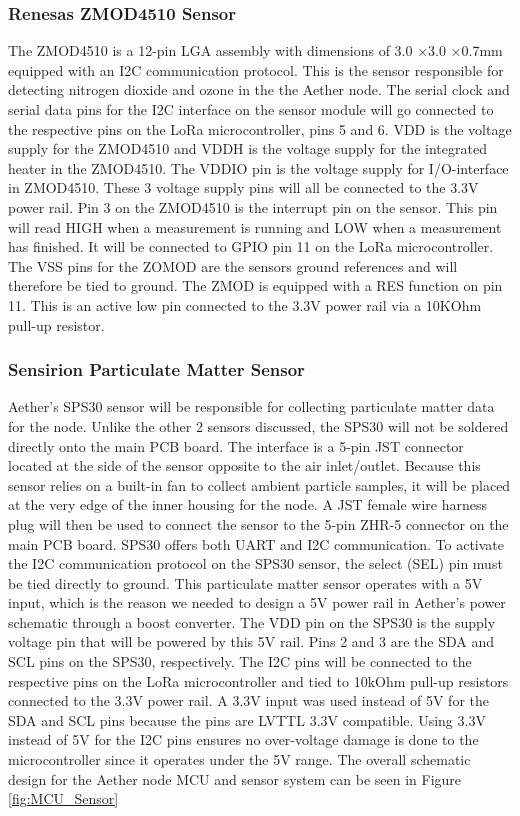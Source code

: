 \paragraph{}

\subsubsection{Renesas ZMOD4510 Sensor}
The ZMOD4510 is a 12-pin LGA assembly with dimensions of 3.0 ×3.0 ×0.7mm equipped with an I2C communication protocol. This is the sensor responsible for detecting nitrogen dioxide and ozone in the the Aether node. The serial clock and serial data pins for the I2C interface on the sensor module will go connected to the respective pins on the LoRa microcontroller, pins 5 and 6. VDD is the voltage supply for the ZMOD4510 and VDDH is the voltage supply for the integrated heater in the ZMOD4510. The VDDIO pin is the voltage supply for I/O-interface in ZMOD4510. These 3 voltage supply pins will all be connected to the 3.3V power rail. Pin 3 on the ZMOD4510 is the interrupt pin on the sensor. This pin will read HIGH when a measurement is running and LOW when a measurement has finished. It will be connected to GPIO pin 11 on the LoRa microcontroller. The VSS pins for the ZOMOD are the sensors ground references and will therefore be tied to ground. The ZMOD is equipped with a RES function on pin 11. This is an  active low pin connected to the 3.3V power rail via a 10KOhm pull-up resistor. 

\subsubsection{Sensirion Particulate Matter Sensor}
Aether's SPS30 sensor will be responsible for collecting particulate matter data for the node. Unlike the other 2 sensors discussed, the SPS30 will not be soldered directly onto the main PCB board. The interface is a 5-pin JST connector located at the side of the sensor opposite to the air inlet/outlet. Because this sensor relies on a built-in fan to collect ambient particle samples, it will be placed at the very edge of the inner housing for the node. A JST female wire harness plug will then be used to connect the sensor to the 5-pin ZHR-5 connector on the main PCB board. SPS30 offers both UART and I2C communication. To activate the I2C communication protocol on the SPS30 sensor, the select (SEL) pin must be tied directly to ground. This particulate matter sensor operates with a 5V input, which is the reason we needed to design a 5V power rail in Aether's power schematic through a boost converter. The VDD pin on the SPS30 is the supply voltage pin that will be powered by this 5V rail. Pins 2 and 3 are the SDA and SCL pins on the SPS30, respectively. The I2C pins will be connected to the respective pins on the LoRa microcontroller and tied to 10kOhm pull-up resistors connected to the 3.3V power rail. A 3.3V input was used instead of 5V for the SDA and SCL pins because the pins are LVTTL 3.3V compatible. Using 3.3V instead of 5V for the I2C pins ensures no over-voltage damage is done to the microcontroller since it operates under the 5V range. The overall schematic design for the Aether node MCU and sensor system can be seen in Figure \ref{fig:MCU_Sensor}

